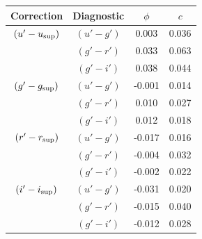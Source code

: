 \noindent\begin{minipage}{\linewidth}
    \centering
    
    \label{table:observations:all ULTRACAM colour corrections}
    \begin{tabular}{cccc}
        Correction          & Diagnostic    & $\phi$    & $c$ \\
        \hline
        \hline
        $(u'-u_{\rm sup})$  &  $(u'-g')$    & 0.003     & 0.036 \\
                            &  $(g'-r')$    & 0.033     & 0.063 \\
                            &  $(g'-i')$    & 0.038     & 0.044 \\
        \hline
        $(g'-g_{\rm sup})$  &  $(u'-g')$    & -0.001    & 0.014 \\
                            &  $(g'-r')$    & 0.010     & 0.027 \\
                            &  $(g'-i')$    & 0.012     & 0.018 \\
        \hline
        $(r'-r_{\rm sup})$  &  $(u'-g')$    & -0.017    & 0.016 \\
                            &  $(g'-r')$    & -0.004    & 0.032 \\
                            &  $(g'-i')$    & -0.002    & 0.022 \\
        \hline
        $(i'-i_{\rm sup})$  &  $(u'-g')$    & -0.031    & 0.020 \\
                            &  $(g'-r')$    & -0.015    & 0.040 \\
                            &  $(g'-i')$    & -0.012    & 0.028 \\
        \hline
        \hline
    \end{tabular}


\end{minipage}
